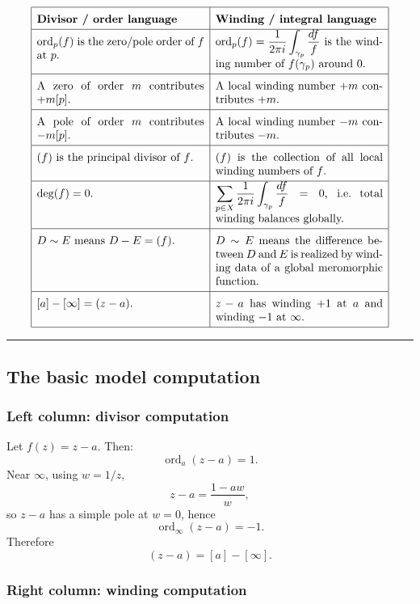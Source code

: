 \documentclass[11pt]{article}
\begin{document}
	\[
	\renewcommand{\arraystretch}{1.6}
	\begin{array}{|p{0.43\textwidth}|p{0.43\textwidth}|}
		\hline
		\textbf{Divisor / order language} & \textbf{Winding / integral language} \\
		\hline
		\(\operatorname{ord}_p(f)\) is the zero/pole order of \(f\) at \(p\). &
		\(\displaystyle \operatorname{ord}_p(f)=\frac{1}{2\pi i}\int_{\gamma_p}\frac{df}{f}\) is the winding number of \(f(\gamma_p)\) around \(0\). \\
		\hline
		A zero of order \(m\) contributes \(+m[p]\). &
		A local winding number \(+m\) contributes \(+m\). \\
		\hline
		A pole of order \(m\) contributes \(-m[p]\). &
		A local winding number \(-m\) contributes \(-m\). \\
		\hline
		\((f)\) is the principal divisor of \(f\). &
		\((f)\) is the collection of all local winding numbers of \(f\). \\
		\hline
		\(\deg(f)=0\). &
		\(\displaystyle \sum_{p\in X}\frac{1}{2\pi i}\int_{\gamma_p}\frac{df}{f}=0\), i.e.\ total winding balances globally. \\
		\hline
		\(D\sim E\) means \(D-E=(f)\). &
		\(D\sim E\) means the difference between \(D\) and \(E\) is realized by winding data of a global meromorphic function. \\
		\hline
		\([a]-[\infty]=(z-a)\). &
		\(z-a\) has winding \(+1\) at \(a\) and winding \(-1\) at \(\infty\). \\
		\hline
	\end{array}
	\]
	
	\bigskip
	\hrule
	\bigskip
	
	\subsection*{The basic model computation}
	
	\subsubsection*{Left column: divisor computation}
	
	Let \(f(z)=z-a\). Then:
	\[
	\operatorname{ord}_a(z-a)=1.
	\]
	Near \(\infty\), using \(w=1/z\),
	\[
	z-a=\frac{1-aw}{w},
	\]
	so \(z-a\) has a simple pole at \(w=0\), hence
	\[
	\operatorname{ord}_\infty(z-a)=-1.
	\]
	Therefore
	\[
	(z-a)=[a]-[\infty].
	\]
	
	\subsubsection*{Right column: winding computation}
	
\end{document}
